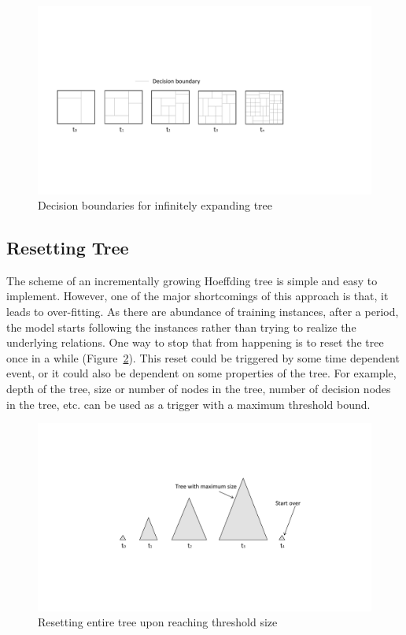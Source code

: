 \begin{figure}[htbp]
    \begin{center}
        \includegraphics[width=14.0cm]{figs/infgrowdb.pdf}
        \caption{Decision boundaries for infinitely expanding tree}
        \label{fig:algo:infgrowdb}
    \end{center}
\end{figure}


\subsection{Resetting Tree}
The scheme of an incrementally growing Hoeffding tree is simple and easy to implement. However, one of the major shortcomings of this approach is that, it leads to over-fitting. As there are abundance of training instances, after a period, the model starts following the instances rather than trying to realize the underlying relations. One way to stop that from happening is to reset the tree once in a while (Figure~\ref{fig:algo:reset}). This reset could be triggered by some time dependent event, or it could also be dependent on some properties of the tree. For example, depth of the tree, size or number of nodes in the tree, number of decision nodes in the tree, etc. can be used as a trigger with a maximum threshold bound.

\begin{figure}[htbp]
    \begin{center}
        \includegraphics[width=12.0cm]{figs/reset.pdf}
        \caption{Resetting entire tree upon reaching threshold size}
        \label{fig:algo:reset}
    \end{center}
\end{figure}


